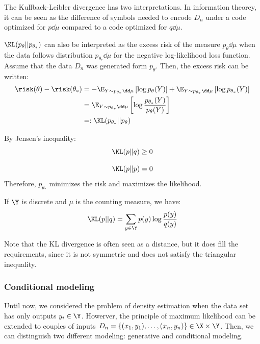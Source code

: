 \documentclass[toc, titlepaged]{../cs-classes/cs-classes}
\begin{document}
The Kullback-Leibler divergence has two interpretations. In information theorey, it can be seen as the difference of symbols needed to encode $D_n$ under a code optimized for $p\dd\mu$ compared to a code optimized for $q\dd\mu$. 

$\KL(p_\theta||p_{\theta_*})$ can also be interpreted as the excess risk of the measure $p_\theta\dd\mu$ when the data follows distribution $p_{\theta_*}\dd\mu$ for the negative log-likelihood loss function. Assume that the data $D_n$ was generated form $p_\theta$. Then, the excess risk can be written:
\begin{equation*}
    \begin{aligned}
        \risk(\theta)-\risk(\theta_*) &= -\E_{Y\sim p_{\theta_*}\dd\mu}\left[\log p_\theta(Y)\right] + \E_{Y\sim p_{\theta_*}\dd\mu}\left[\log p_{\theta_*}(Y)\right]\\
        &= \E_{Y\sim p_{\theta_*}\dd\mu}\left[\log \frac{p_{\theta_*}(Y)}{p_\theta(Y)}\right]\\
        &=: \KL(p_{\theta_*}||p_\theta)
    \end{aligned}
\end{equation*}

\begin{property}[Positivity]
    By Jensen's inequality:
    \begin{equation}
        \KL(p||q) \geq 0
    \end{equation}    
\end{property}

\begin{property}[Separation]
    \begin{equation}
        \KL(p||p) = 0
    \end{equation}
    Therefore, $p_{\theta_*}$ minimizes the risk and maximizes the likelihood.
\end{property}

\begin{property}
    If $\Y$ is discrete and $\mu$ is the counting measure, we have:
    \begin{equation}
        \KL(p||q) = \sum_{y\in\Y}p(y)\log\frac{p(y)}{q(y)}
    \end{equation}
\end{property}

Note that the KL divergence is often seen as a distance, but it does fill the requirements, since it is not symmetric and does not satisfy the triangular inequality.

\subsubsection{Conditional modeling}
Until now, we considered the problem of density estimation when the data set has only outputs $y_i\in\Y$. Howerver, the principle of maximum likelihood can be extended to couples of inputs $D_n=\{(x_1, y_1), \dots, (x_n, y_n)\}\in\X\times\Y$. Then, we can distinguish two different modeling: generative and conditional modeling.
\end{document}
